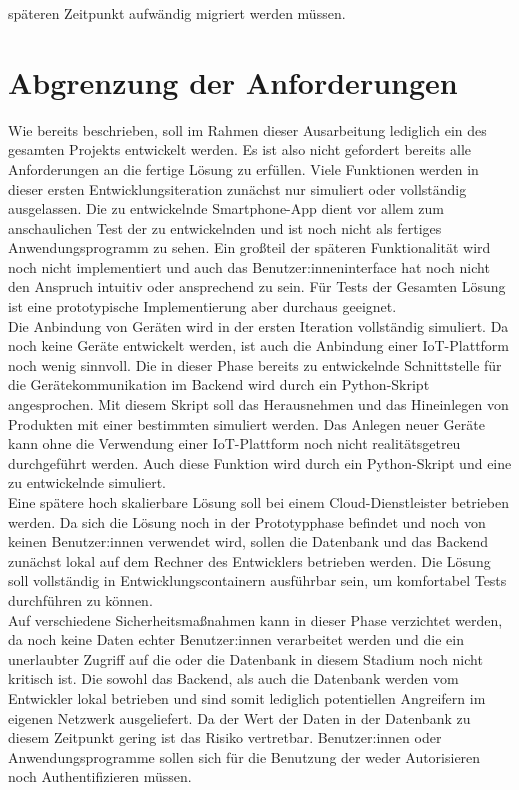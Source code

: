 späteren Zeitpunkt aufwändig migriert werden müssen. 

\section{Abgrenzung der Anforderungen}\label{sec:Abgrenzung der Anforderungen}

Wie bereits beschrieben, soll im Rahmen dieser Ausarbeitung lediglich ein  des gesamten Projekts entwickelt werden. Es ist also nicht gefordert bereits alle Anforderungen an die fertige Lösung zu erfüllen. Viele Funktionen werden in dieser ersten Entwicklungsiteration zunächst nur simuliert oder vollständig ausgelassen. Die zu entwickelnde Smartphone-App dient vor allem zum anschaulichen Test der zu entwickelnden  und ist noch nicht als fertiges Anwendungsprogramm zu sehen. Ein großteil der späteren Funktionalität wird noch nicht implementiert und auch das Benutzer:inneninterface hat noch nicht den Anspruch intuitiv oder ansprechend zu sein. Für Tests der Gesamten Lösung ist eine prototypische Implementierung aber durchaus geeignet.\\ Die Anbindung von Geräten wird in der ersten Iteration vollständig simuliert. Da noch keine Geräte entwickelt werden, ist auch die Anbindung einer IoT-Plattform noch wenig sinnvoll. Die in dieser Phase bereits zu entwickelnde Schnittstelle für die Gerätekommunikation im Backend wird durch ein Python-Skript angesprochen. Mit diesem Skript soll das Herausnehmen und das Hineinlegen von Produkten mit einer bestimmten  simuliert werden. Das Anlegen neuer Geräte kann ohne die Verwendung einer IoT-Plattform noch nicht realitätsgetreu durchgeführt werden. Auch diese Funktion wird durch ein Python-Skript und eine zu entwickelnde  simuliert.\\ Eine spätere hoch skalierbare Lösung soll bei einem Cloud-Dienstleister betrieben werden. Da sich die Lösung noch in der Prototypphase befindet und noch von keinen Benutzer:innen verwendet wird, sollen die Datenbank und das Backend zunächst lokal auf dem Rechner des Entwicklers betrieben werden. Die Lösung soll vollständig in Entwicklungscontainern ausführbar sein, um komfortabel Tests durchführen zu können.\\ Auf verschiedene Sicherheitsmaßnahmen kann in dieser Phase verzichtet werden, da noch keine Daten echter Benutzer:innen verarbeitet werden und die ein unerlaubter Zugriff auf die  oder die Datenbank in diesem Stadium noch nicht kritisch ist. Die sowohl das Backend, als auch die Datenbank werden vom Entwickler lokal betrieben und sind somit lediglich potentiellen Angreifern im eigenen Netzwerk ausgeliefert. Da der Wert der Daten in der Datenbank zu diesem Zeitpunkt gering ist das Risiko vertretbar. Benutzer:innen oder Anwendungsprogramme sollen sich für die Benutzung der  weder Autorisieren noch Authentifizieren müssen.